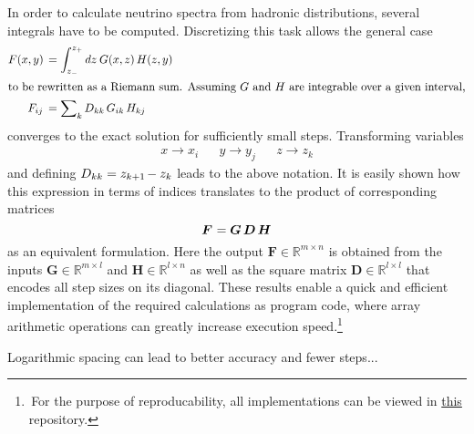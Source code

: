 In order to calculate neutrino spectra from hadronic distributions, several integrals have to be computed. Discretizing
this task allows the general case
\begin{align*}
	F(x, y) \kern+1.5pt &= \int_{z_{-}}^{z_{+}} dz \: G(x, z) \, H(z, y) \\
	\intertext{to be rewritten as a Riemann sum. Assuming $G$ and $H$ are integrable over a given interval,}
	F_{ij} \kern+1.8pt &= \sum\nolimits_k D_{kk} \, G_{ik} \, H_{kj}
\end{align*}
converges to the exact solution for sufficiently small steps. Transforming variables
\begin{align*}
	&&&& x \rightarrow x_i && y \rightarrow y_j && z \rightarrow z_k &&&&
\end{align*}
and defining $D_{kk} = z_{k+1} \kern-1.0pt - z_k$ leads to the above notation. It is easily shown how this expression in terms of
indices translates to the product of corresponding matrices
\begin{equation*}
	\bm{F} \kern+0.6pt = \bm{G} \, \bm{D} \, \bm{H}
\end{equation*}
as an equivalent formulation. Here the output $\bm{F} \in \mathbb{R}^{m \times n}$ is obtained from the inputs
$\bm{G} \in \mathbb{R}^{m \times l}$ and $\bm{H} \in \mathbb{R}^{l \times n}$ as well as the square matrix
$\bm{D} \in \mathbb{R}^{l \times l}$ that encodes all step sizes on its diagonal. These results enable a quick and
efficient implementation of the required calculations as program code, where array arithmetic operations can greatly
increase execution speed.\footnote{$\,$For the purpose of reproducability, all implementations can be viewed in
\href{https://github.com/fritzali/bachelor}{this} repository.}

Logarithmic spacing can lead to better accuracy and fewer steps...

